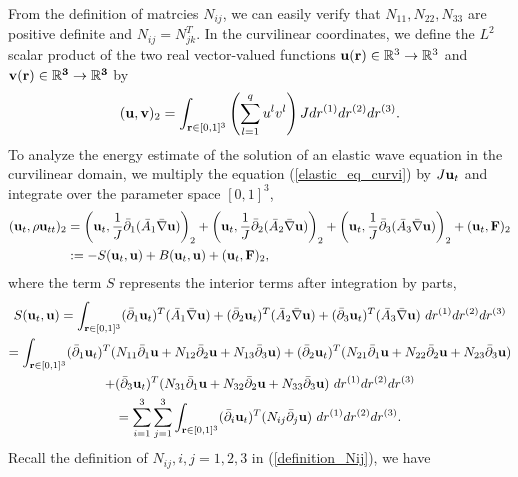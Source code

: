 \documentclass[a4paper]{article}
\begin{document}
From the definition of matrcies $N_{ij}$, we can easily verify that $N_{11}, N_{22}, N_{33}$ are positive definite and $N_{ij} = N_{jk}^T$. In the curvilinear coordinates, we define the $L^2$ scalar product of the two real vector-valued functions ${\bf u}({\bf r})\in\mathbb{R}^3\rightarrow \mathbb{R}^3$ and ${\bf v}(\bf r)\in\mathbb{R}^3\rightarrow \mathbb{R}^3$ by
\begin{equation*}
({\bf u},{\bf v})_2 = \int_{{\bf r}\in[0,1]^3} \left(\sum_{l=1}^q u^{l}v^{l}\right)Jdr^{(1)}dr^{(2)}dr^{(3)}.
\end{equation*}
To analyze the energy estimate of the solution of an elastic wave equation in the curvilinear domain, we multiply the equation (\ref{elastic_eq_curvi}) by $J{\bf u}_t$ and integrate over the parameter space $[0,1]^3$,
\begin{align}\label{time_deri_curvi}
({\bf u}_t,\rho {\bf u}_{tt})_2 &= \left({\bf u}_t,\frac{1}{J}\bar{\partial}_1(\bar{A}_1\bar{\nabla}{\bf u})\right)_2+ \left({\bf u}_t,\frac{1}{J}\bar{\partial}_2(\bar{A}_2\bar{\nabla}{\bf u})\right)_2+ \left({\bf u}_t,\frac{1}{J}\bar{\partial}_3(\bar{A}_3\bar{\nabla}{\bf u})\right)_2+({\bf u}_t, {\bf F})_2\nonumber\\
&:= -S({\bf u}_t,{\bf u}) + B({\bf u}_t,{\bf u}) + ({\bf u}_t,{\bf F})_2,
\end{align}
where the term $S$ represents the interior terms after integration by parts,
\begin{multline*}
S({\bf u}_t,{\bf u}) = \int_{{\bf r}\in[0,1]^3} (\bar{\partial}_1 {\bf u}_t)^T ({\bar A}_1\bar{\nabla}{\bf u}) + (\bar{\partial}_2 {\bf u}_t)^T ({\bar A}_2\bar{\nabla}{\bf u}) + (\bar{\partial}_3 {\bf u}_t)^T ({\bar A}_3\bar{\nabla}{\bf u})\ dr^{(1)}dr^{(2)}dr^{(3)}\\
 = \int_{{\bf r}\in[0,1]^3} (\bar{\partial}_1 {\bf u}_t)^T (N_{11}\bar{\partial}_1{\bf u} +N_{12}\bar{\partial}_2{\bf u}+ N_{13}\bar{\partial}_3{\bf u}) + (\bar{\partial}_2 {\bf u}_t)^T (N_{21}\bar{\partial}_1{\bf u} +N_{22}\bar{\partial}_2{\bf u}+ N_{23}\bar{\partial}_3{\bf u}) \\
 +(\bar{\partial}_3 {\bf u}_t)^T (N_{31}\bar{\partial}_1{\bf u} +N_{32}\bar{\partial}_2{\bf u}+ N_{33}\bar{\partial}_3{\bf u})\ dr^{(1)}dr^{(2)}dr^{(3)}\\
 = \sum_{i = 1}^3\sum_{j=1}^3  \int_{{\bf r}\in[0,1]^3} (\bar{\partial}_i {\bf u}_t)^T(N_{ij}\bar{\partial}_j {\bf u})\ dr^{(1)}dr^{(2)}dr^{(3)}.
\end{multline*}
Recall the definition of $N_{ij}, i,j = 1,2,3$ in (\ref{definition_Nij}), we have
\end{document}
